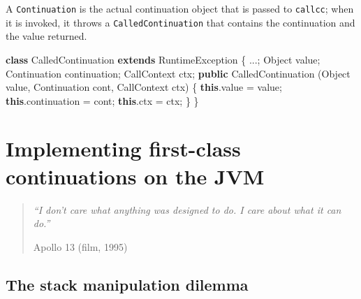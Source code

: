 \documentclass[12pt,a4paper,oneside,openright]{book}
\newenvironment{Shaded}{\begin{snugshade}}{\end{snugshade}}
\newcommand{\KeywordTok}[1]{\textcolor[rgb]{0.13,0.29,0.53}{\textbf{{#1}}}}
\newcommand{\FunctionTok}[1]{\textcolor[rgb]{0.00,0.00,0.00}{{#1}}}
\newcommand{\NormalTok}[1]{{#1}}
\begin{document}
A \texttt{Continuation} is the actual continuation object that is passed
to \texttt{callcc}; when it is invoked, it throws a
\texttt{CalledContinuation} that contains the continuation and the value
returned.

\begin{Shaded}
\begin{Highlighting}[]
    \KeywordTok{class} \NormalTok{CalledContinuation}
        \KeywordTok{extends} \NormalTok{RuntimeException \{}
        \NormalTok{...;}
        \NormalTok{Object value;}
        \NormalTok{Continuation continuation;}
        \NormalTok{CallContext ctx;}
        \KeywordTok{public} \NormalTok{CalledContinuation}
            \NormalTok{(Object value, Continuation cont, CallContext ctx) \{}
            \KeywordTok{this}\NormalTok{.}\FunctionTok{value} \NormalTok{= value;}
            \KeywordTok{this}\NormalTok{.}\FunctionTok{continuation} \NormalTok{= cont;}
            \KeywordTok{this}\NormalTok{.}\FunctionTok{ctx} \NormalTok{= ctx;}
        \NormalTok{\}}
    \NormalTok{\}}
\end{Highlighting}
\end{Shaded}

\chapter{Implementing first-class continuations on the
JVM}\label{implementing-first-class-continuations-on-the-jvm}

\begin{quote}
\emph{``I don't care what anything was designed to do. I care about what
it can do.''}

\begin{flushright}
Apollo 13 (film, 1995)
\end{flushright}
\end{quote}

\section{The stack manipulation
dilemma}\label{the-stack-manipulation-dilemma}
\end{document}
